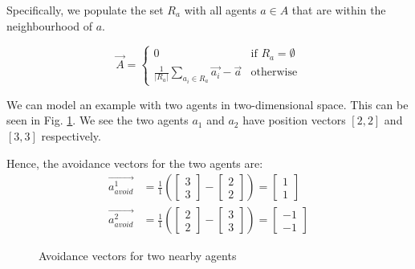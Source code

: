 \documentclass[12pt]{article}
\begin{document}
Specifically, we populate the set $R_a$ with all agents $a \in A$ that are within the neighbourhood of $a$.

\begin{equation}
\vec{A} = 
\begin{cases}
    0 & \text{if } R_a = \emptyset \\
    \frac{1}{|R_a|} \sum_{a_i \in R_a} \vec{a_i} - \vec{a} & \text{otherwise}
\end{cases}
\end{equation}

We can model an example with two agents in two-dimensional space. This can be seen in Fig. \ref{fig:avoidance-2d}. We see the two agents $a_1$ and $a_2$ have position vectors $[2,2]$ and $[3,3]$ respectively.

Hence, the avoidance vectors for the two agents are:
\begin{equation}
    \begin{aligned}
        \vec{a_{avoid}^1} &= \frac{1}{1} \left( \begin{bmatrix} 3 \\ 3 \end{bmatrix} - \begin{bmatrix} 2 \\ 2 \end{bmatrix} \right) = \begin{bmatrix} 1 \\ 1 \end{bmatrix} \\
        \vec{a_{avoid}^2} &= \frac{1}{1} \left( \begin{bmatrix} 2 \\ 2 \end{bmatrix} - \begin{bmatrix} 3 \\ 3 \end{bmatrix} \right) = \begin{bmatrix} -1 \\ -1 \end{bmatrix}
    \end{aligned}
\end{equation}

\begin{figure}[H]
    \centering
    \caption{Avoidance vectors for two nearby agents}
    \label{fig:avoidance-2d}
\end{figure}
\end{document}
